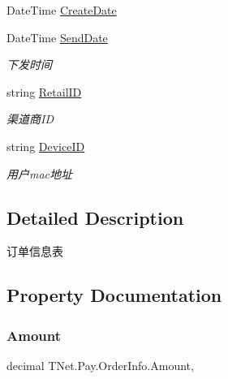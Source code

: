 \begin{DoxyCompactItemize}
Date\+Time \mbox{\hyperlink{class_t_net_1_1_pay_1_1_order_info_ae668817cc8132635fcfc0289fbe6a42e}{Create\+Date}}
\item 
Date\+Time \mbox{\hyperlink{class_t_net_1_1_pay_1_1_order_info_a1ce6559405f6271e632916cfe035960b}{Send\+Date}}
\begin{DoxyCompactList}\small\item\em 下发时间 \end{DoxyCompactList}\item 
string \mbox{\hyperlink{class_t_net_1_1_pay_1_1_order_info_ab86591e3e19ebddb39af95d5b9e2ea62}{Retail\+ID}}
\begin{DoxyCompactList}\small\item\em 渠道商\+ID \end{DoxyCompactList}\item 
string \mbox{\hyperlink{class_t_net_1_1_pay_1_1_order_info_a4cf490d999f9b9cb502981aebc8b921c}{Device\+ID}}
\begin{DoxyCompactList}\small\item\em 用户mac地址 \end{DoxyCompactList}\end{DoxyCompactItemize}


\subsection{Detailed Description}
订单信息表 



\subsection{Property Documentation}
\mbox{\label{class_t_net_1_1_pay_1_1_order_info_abd4991e474b31dc730d62a33361d45ee}} 
\subsubsection{\texorpdfstring{Amount}{Amount}}
{\footnotesize\ttfamily decimal T\+Net.\+Pay.\+Order\+Info.\+Amount\hspace{0.3cm}{\ttfamily [get]}, {\ttfamily [set]}}



